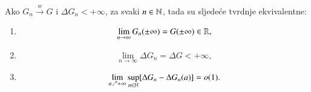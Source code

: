 \begin{lm}  \label{lm:16.7}
    Ako $G_n \xrightarrow{w} G$ i $\Delta G_n < +\infty$, za svaki $n \in \mathbb{N}$, tada su sljede\' ce tvrdnje ekvivalentne:
    \begin{enumerate}[label=(\roman*)]
        \item \label{lm:16.7.1}
        \begin{equation*}
            \lim\limits_{n \to \infty} G_n (\pm \infty) = G(\pm \infty) \in \mathbb{R},
        \end{equation*}
        \item \label{lm:16.7.2}
        \begin{equation*}
            \lim\limits_{n \to \infty} \Delta G_n = \Delta G < +\infty,
        \end{equation*}
        \item \label{lm:16.7.3}
        \begin{equation*}
            \lim\limits_{a \nearrow +\infty} \sup\limits_{n \in \mathbb{N}} [ \Delta G_n - \Delta G_n (a) ] = o(1).
        \end{equation*}
    \end{enumerate}
\end{lm}

